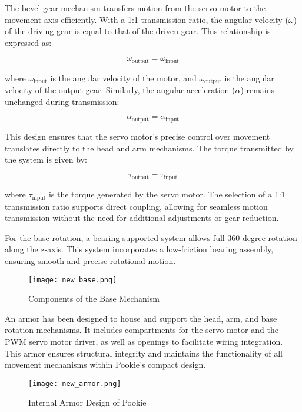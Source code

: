 \begin{enumerate}
The bevel gear mechanism transfers motion from the servo motor to the movement axis efficiently. With a 1:1 transmission ratio, the angular velocity (\(\omega\)) of the driving gear is equal to that of the driven gear. This relationship is expressed as:

\[
\omega_{\text{output}} = \omega_{\text{input}}
\]

where \(\omega_{\text{input}}\) is the angular velocity of the motor, and \(\omega_{\text{output}}\) is the angular velocity of the output gear. Similarly, the angular acceleration (\(\alpha\)) remains unchanged during transmission:

\[
\alpha_{\text{output}} = \alpha_{\text{input}}
\]

This design ensures that the servo motor’s precise control over movement translates directly to the head and arm mechanisms. The torque transmitted by the system is given by:

\[
\tau_{\text{output}} = \tau_{\text{input}}
\]

where \(\tau_{\text{input}}\) is the torque generated by the servo motor. The selection of a 1:1 transmission ratio supports direct coupling, allowing for seamless motion transmission without the need for additional adjustments or gear reduction.

For the base rotation, a bearing-supported system allows full 360-degree rotation along the z-axis. This system incorporates a low-friction bearing assembly, ensuring smooth and precise rotational motion.

\begin{figure}[!htb]
    \centering
    \texttt{[image: new\_base.png]}
    \caption{Components of the Base Mechanism}
    \label{fig:base_comp}
\end{figure}

An armor has been designed to house and support the head, arm, and base rotation mechanisms. It includes compartments for the servo motor and the PWM servo motor driver, as well as openings to facilitate wiring integration. This armor ensures structural integrity and maintains the functionality of all movement mechanisms within Pookie’s compact design.

\begin{figure}[!htb]
    \centering
    \texttt{[image: new\_armor.png]}
    \caption{Internal Armor Design of Pookie}
    \label{fig:new_armor}
\end{figure}


\end{enumerate}

